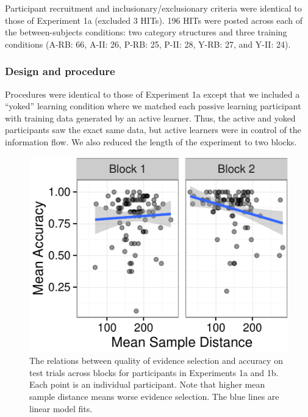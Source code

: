 \documentclass[10pt, letterpaper]{article}
\newenvironment{CodeChunk}{}{}
\begin{document}
Participant recruitment and inclusionary/exclusionary criteria were
identical to those of Experiment 1a (excluded 3 HITs). 196 HITs were
posted across each of the between-subjects conditions: two category
structures and three training conditions (A-RB: 66, A-II: 26, P-RB: 25,
P-II: 28, Y-RB: 27, and Y-II: 24).

\subsubsection{Design and procedure}\label{design-and-procedure-1}

Procedures were identical to those of Experiment 1a except that we
included a ``yoked'' learning condition where we matched each passive
learning participant with training data generated by an active learner.
Thus, the active and yoked participants saw the exact same data, but
active learners were in control of the information flow. We also reduced
the length of the experiment to two blocks.

\begin{CodeChunk}
\begin{figure}[t]

\includegraphics{figs/samp_acc_scatter_plot-1} \hfill{}

\caption[The relations between quality of evidence selection and accuracy on test trials across blocks for participants in Experiments 1a and 1b]{The relations between quality of evidence selection and accuracy on test trials across blocks for participants in Experiments 1a and 1b. Each point is an individual participant. Note that higher mean sample distance means worse evidence selection. The blue lines are linear model fits.}\label{fig:samp_acc_scatter_plot}
\end{figure}
\end{CodeChunk}
\end{document}
